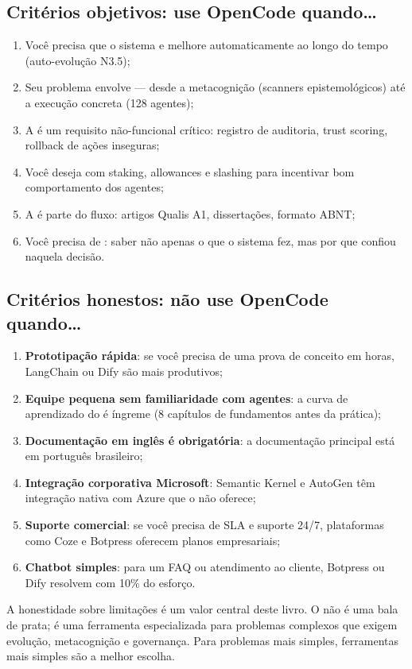 \subsection{Critérios objetivos: use OpenCode quando\ldots}
\begin{enumerate}
\item Você precisa que o sistema  e melhore automaticamente ao longo do tempo (auto-evolução N3.5);
\item Seu problema envolve 
--- desde a metacognição (scanners epistemológicos) até a
execução concreta (128 agentes);
\item A  é um requisito não-funcional crítico:
registro de auditoria, trust scoring, rollback de ações
inseguras;
\item Você deseja  com staking,
allowances e slashing para incentivar bom comportamento dos
agentes;
\item A  é parte do fluxo: artigos
Qualis A1, dissertações, formato ABNT;
\item Você precisa de :
saber não apenas o que o sistema fez, mas por que confiou
naquela decisão.
\end{enumerate}
\subsection{Critérios honestos: não use OpenCode quando\ldots}
\begin{enumerate}
\item \textbf{Prototipação rápida}: se você precisa de uma prova de
conceito em horas, LangChain ou Dify são mais produtivos;
\item \textbf{Equipe pequena sem familiaridade com agentes}: a curva
de aprendizado do \opencodeeco{} é íngreme (8 capítulos de
fundamentos antes da prática);
\item \textbf{Documentação em inglês é obrigatória}: a documentação
principal está em português brasileiro;
\item \textbf{Integração corporativa Microsoft}: Semantic Kernel e
AutoGen têm integração nativa com Azure que o \opencodeeco{}
não oferece;
\item \textbf{Suporte comercial}: se você precisa de SLA e suporte
24/7, plataformas como Coze e Botpress oferecem planos
empresariais;
\item \textbf{Chatbot simples}: para um FAQ ou atendimento ao
cliente, Botpress ou Dify resolvem com 10\% do esforço.
\end{enumerate}
\begin{observacao}
A honestidade sobre limitações é um valor central deste livro. O
\opencodeeco{} não é uma bala de prata; é uma ferramenta especializada
para problemas complexos que exigem evolução, metacognição e governança.
Para problemas mais simples, ferramentas mais simples são a melhor
escolha.
\end{observacao}
